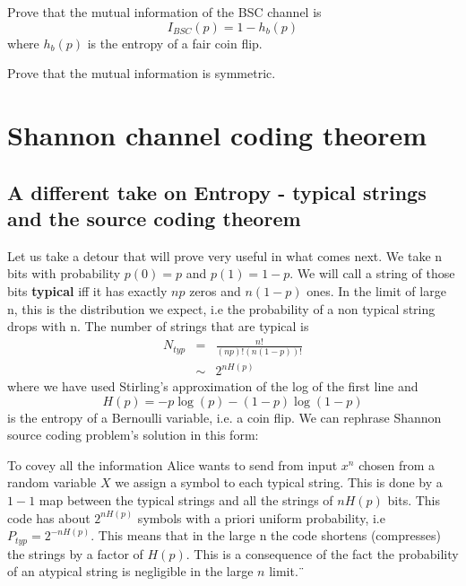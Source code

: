 \begin{example}
Prove that the mutual information of the BSC channel is
	\begin{equation}
		I_{BSC}(p) = 1 - h_b(p)
	\end{equation}
where $h_b(p)$ is the entropy of a fair coin flip.   
\end{example}

\begin{example}
	Prove that the mutual information is symmetric.   
\end{example}




\section{Shannon channel coding theorem}

\subsection{A different take on Entropy - typical strings and the source coding theorem}
Let us take a detour that will prove very useful in what comes next. We take n bits with probability $p(0) = p$ and $p(1) = 1 -p$. We will call a string of those bits \textbf{typical} iff it has exactly $np$ zeros and $n(1-p)$ ones. In the limit of large n, this is the distribution we expect, i.e the probability of a non typical string drops with n. The number of strings that are typical is
\begin{eqnarray}
N_{typ} &=& \frac{n!}{(np)!(n(1-p))!} \\
&\sim& 2^{nH(p)}
\end{eqnarray} 
where we have used Stirling's approximation of the log of the first line and $$H(p) = -p\log(p) -(1-p)\log(1-p)$$ is the entropy of a Bernoulli variable, i.e. a coin flip.
We can rephrase Shannon source coding problem's solution in this form:
\begin{info}
	To covey all the information Alice wants to send from input $x^n$ chosen from a random variable $X$ we assign a symbol to each typical string. This is done by a $1-1$ map between the typical strings and all the strings of $nH(p)$ bits. This code has about $2^{nH(p)}$ symbols with a priori uniform probability, i.e $P_{typ} = 2^{-nH(p)}$. This means that in the large n the code shortens (compresses) the strings by a factor of $H(p)$. This is a consequence of the fact the probability of an atypical string is negligible in the large $n$ limit.¨
\end{info}
